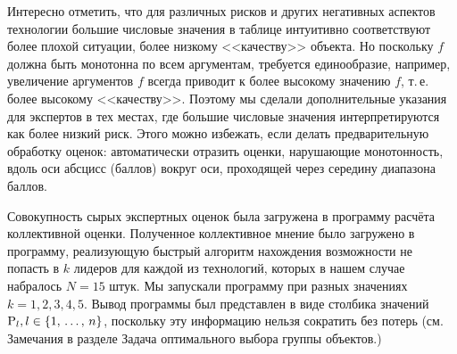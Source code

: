 Интересно отметить, что для различных рисков и других негативных аспектов технологии большие числовые значения в таблице интуитивно соответствуют более плохой ситуации, более низкому <<качеству>> объекта. Но поскольку $f$ должна быть монотонна по всем аргументам, требуется единообразие, например, увеличение аргументов $f$  всегда приводит к более высокому значению $f$, т.\,е. более высокому <<качеству>>. Поэтому мы сделали дополнительные указания для экспертов в тех местах, где большие числовые значения интерпретируются как более низкий риск. Этого можно избежать, если делать предварительную обработку оценок: автоматически отразить оценки, нарушающие монотонность, вдоль оси абсцисс (баллов) вокруг оси, проходящей через середину диапазона баллов.

Совокупность сырых экспертных оценок была загружена в программу расчёта коллективной оценки. Полученное коллективное мнение было загружено в программу, реализующую быстрый алгоритм нахождения возможности не попасть в $k$ лидеров для каждой из технологий, которых в нашем случае набралось $N = 15$ штук. Мы запускали программу при разных значениях $k = 1, 2, 3, 4, 5$. Вывод программы был представлен в виде столбика значений ${\mathrm{P}}_l, l \in \{1,\, \ldots,\, n\}$, поскольку эту информацию нельзя сократить без потерь (см. Замечания в разделе Задача оптимального выбора группы объектов.)

